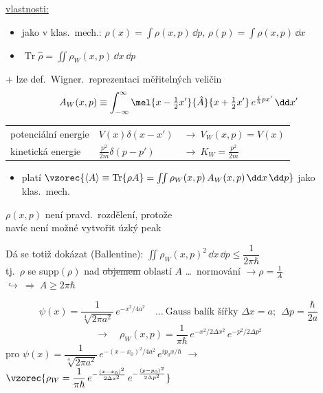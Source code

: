 \underline{vlastnosti:}
\begin{itemize}[nosep]
  \item jako v klas.\ mech.: \quad $\rho(x) = \int\rho(x,p)\,\dd p$, \quad $\rho(p) = \int\rho(x,p)\,\dd x$
  \item $\operatorname{Tr}\hat\rho = \iint\rho_W(x,p)\,\dd x\,\dd p$
\end{itemize}

+ lze def.\ Wigner.\ reprezentaci měřitelných veličin
\[
  A_W(x,p) \equiv \int_{-\infty}^{\infty}\mel{x-\tfrac12x'}{\hat A}{x+\tfrac12x'}\,e^{\frac{i}{\hbar}px'}\,\dd x'
\]

\begin{priklad}[Příklad]
\begin{tabular}{@{}lll}
potenciální energie & $V(x)\delta(x-x')$ & $\longrightarrow\ V_W(x,p) = V(x)$ \\[2pt]
kinetická energie & $\frac{p^2}{2m}\delta(p-p')$ & $\longrightarrow\ K_W = \frac{p^2}{2m}$
\end{tabular}
\end{priklad}

\begin{itemize}
  \item platí \quad $\vzorec{\langle A\rangle \equiv \operatorname{Tr}\{\rho A\} = \iint\rho_W(x,p)\,A_W(x,p)\,\dd x\,\dd p}$ \quad jako klas.\ mech.
\end{itemize}

 $\rho(x,p)$ není pravd.\ rozdělení, protože  \\
navíc není možné vytvořit úzký peak

Dá se totiž dokázat (Ballentine): \quad $\iint\rho_W(x,p)^2\,\dd x\,\dd p \leq \dfrac{1}{2\pi\hbar}$ \\
\quad tj.\ $\rho$ se supp$(\rho)$ nad \sout{objemem} oblastí $A$ \dots\ normování $\to \rho = \frac1A$ \quad $\hookrightarrow\ \Rightarrow\ A\geq 2\pi\hbar$

\begin{priklad}
\[
  \psi(x) = \frac{1}{\sqrt[4]{2\pi a^2}}\,e^{-x^2/4a^2} \quad\dots\ \text{Gauss balík šířky } \Delta x = a;\ \ \Delta p = \frac{\hbar}{2a}
\]
\[
  \longrightarrow\quad \rho_W(x,p) = \frac{1}{\pi\hbar}\,e^{-x^2/2\Delta x^2}\,e^{-p^2/2\Delta p^2}
\]
pro \quad $\psi(x) = \dfrac{1}{\sqrt[4]{2\pi a^2}}\,e^{-(x-x_0)^2/4a^2}\,e^{ip_0x/\hbar}$ \quad $\longrightarrow$ \quad
$\vzorec{\rho_W = \dfrac{1}{\pi\hbar}\,e^{-\frac{(x-x_0)^2}{2\Delta x^2}}\,e^{-\frac{(p-p_0)^2}{2\Delta p^2}}}$
\end{priklad}

